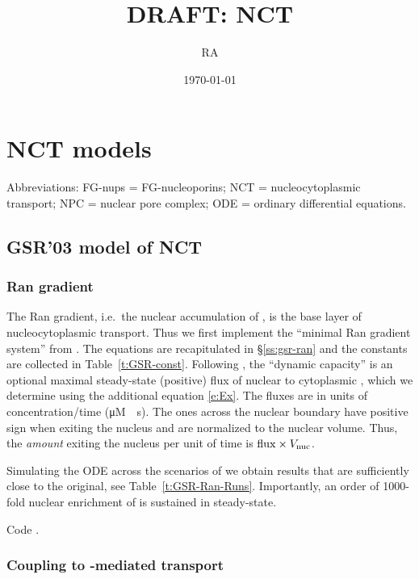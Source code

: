 \documentclass[12pt,notitlepage]{article}
\title{DRAFT: NCT}
\author{RA}
\date{\today}
\begin{document}
\maketitle

\section{NCT models}

Abbreviations:
FG-nups = FG-nucleoporins;
NCT = nucleocytoplasmic transport;
NPC = nuclear pore complex;
ODE = ordinary differential equations.

\subsection{GSR'03 model of NCT} \label{s:GSR03}

\subsubsection*{Ran gradient} \label{s:GSR03:Ran}

The Ran gradient,
i.e.~the nuclear accumulation of ,
is the base layer of nucleocytoplasmic transport.
%
%
Thus we first implement
the ``minimal Ran gradient system'' from 
\cite{GoerlichSeewaldRibbeck2003}.
%
%
The equations are recapitulated in
\S\ref{ss:gsr-ran}
and
the constants are collected in 
Table~\ref{t:GSR-const}.
%
%
Following \cite{GoerlichSeewaldRibbeck2003},
the ``dynamic capacity'' 
is an optional maximal steady-state (positive) flux
of nuclear  to cytoplasmic ,
which we determine using the additional equation \eqref{e:Ex}.
%
%
The fluxes 
are in units of concentration/time (\si{\micro M \per s}).
%
The ones across the nuclear boundary
have positive sign when exiting the nucleus
and are normalized to the nuclear volume.
%
Thus,
the \emph{amount} exiting the nucleus per unit of time is
$\ce{flux} \times V_\text{nuc}$.

%

Simulating the ODE
across the scenarios of 
\cite{GoerlichSeewaldRibbeck2003}
we obtain 
results that are sufficiently close
to the original,
see Table~\ref{t:GSR-Ran-Runs}.
%
%
Importantly,
an order of 1000-fold nuclear enrichment of 
is sustained in steady-state.
	
%

Code .

%

\subsubsection*{Coupling to -mediated transport} \label{s:GSR03:Imp}
\end{document}
